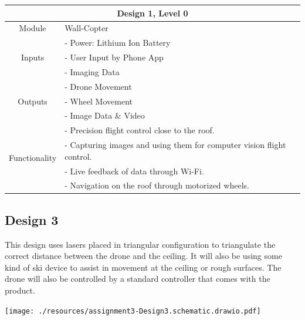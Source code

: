 \documentclass[12pt]{article}
\begin{document}
            \vspace{0.5in}
            \begin{tabular}{|c|l|}
                \hline
                \multicolumn{2}{|c|}{\textbf{Design 1, Level 0}} \\\hline
                Module & Wall-Copter \\\hline
                \multirow{3}{3cm}{Inputs}
                    & - Power: Lithium Ion Battery\\
                    & - User Input by Phone App \\
                    & - Imaging Data \\
                    \hline
                \multirow{3}{3cm}{Outputs}
                    & - Drone Movement \\
                    & - Wheel Movement \\
                    & - Image Data \& Video \\
                    \hline
                \multirow{4}{3cm}{Functionality}
                    & - Precision flight control close to the roof. \\
                    & - Capturing images and using them for computer vision flight control. \\
                    & - Live feedback of data through Wi-Fi. \\
                    & - Navigation on the roof through motorized wheels. \\
                    \hline
                
            \end{tabular}

        \newpage
        \subsection{Design 3}
            This design uses lasers placed in triangular configuration to triangulate the correct distance between the drone and the ceiling.
            It will also be using some kind of ski device to assist in movement at the ceiling or rough surfaces.
            The drone will also be controlled by a standard controller that comes with the product.

            \vspace{0.5in}
            \centerline{\texttt{[image: ./resources/assignment3-Design3.schematic.drawio.pdf]}}
\end{document}
